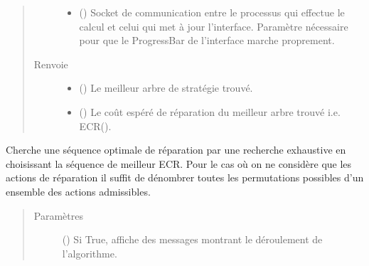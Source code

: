 \documentclass[letterpaper,10pt,french]{sphinxmanual}
\begin{document}
\begin{fulllineitems}
\begin{fulllineitems}
\begin{quote}
\begin{description}
\begin{itemize}
\item {} 
 (\sphinxstyleliteralemphasis{\sphinxupquote{, }}) \textendash{} Socket de communication entre le processus qui effectue le calcul
et celui qui met à jour l’interface. Paramètre nécessaire pour que
le ProgressBar de l’interface marche proprement.

\end{itemize}

\item[{Renvoie}] \leavevmode
\begin{itemize}
\item {} 
 () \textendash{} Le meilleur arbre de stratégie trouvé.

\item {} 
 () \textendash{} Le coût espéré de réparation du meilleur arbre trouvé i.e.
ECR().

\end{itemize}


\end{description}\end{quote}

\end{fulllineitems}


\begin{fulllineitems}
\label{\detokenize{index:DecisionTheoreticTroubleshooting.TroubleShootingProblem.brute_force_solver_actions_only}}
Cherche une séquence optimale de réparation par une recherche
exhaustive en choisissant la séquence de meilleur ECR. Pour le cas où
on ne considère que les actions de réparation il suffit de dénombrer
toutes les permutations possibles d’un ensemble des actions
admissibles.
\begin{quote}\begin{description}
\item[{Paramètres}] \leavevmode
{} (\sphinxstyleliteralemphasis{\sphinxupquote{, }}) \textendash{} Si True, affiche des messages montrant le déroulement de
l’algorithme.


\end{description}
\end{quote}
\end{fulllineitems}
\end{fulllineitems}
\end{document}
